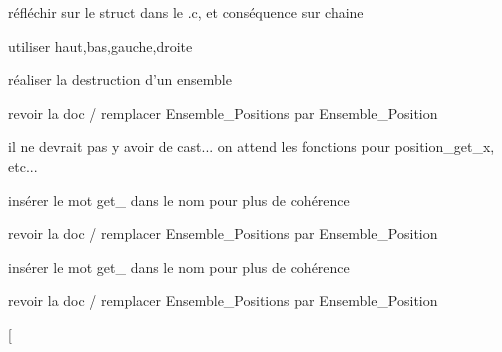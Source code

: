 
\begin{DoxyRefList}
\item[\label{todo__todo000011}%
\hypertarget{todo__todo000011}{}%
\-Membre \hyperlink{libertes_8c_ad3022110d9d089ca0e9672f8aa89bbf1}{determine\-Liberte} (\-Plateau plateau, \-Chaine chaine)]réfléchir sur le struct dans le .c, et conséquence sur chaine 

utiliser haut,bas,gauche,droite  
\item[\label{todo__todo000003}%
\hypertarget{todo__todo000003}{}%
\-Membre \hyperlink{ensemble_8c_a70c89a2b7f9244151c66ffc2b195b8c5}{detruire\-\_\-ensemble} (\hyperlink{structEnsemble}{\-Ensemble} \-E)]réaliser la destruction d'un ensemble  
\item[\label{todo__todo000007}%
\hypertarget{todo__todo000007}{}%
\-Fichier \hyperlink{ensemble__colores_8c}{ensemble\-\_\-colores.c} ]revoir la doc / remplacer \-Ensemble\-\_\-\-Positions par \-Ensemble\-\_\-\-Position  
\item[\label{todo__todo000008}%
\hypertarget{todo__todo000008}{}%
\-Membre \hyperlink{ensemble__colores_8c_a36d527e790ae93f72f0b0c6479f90e41}{ensemble\-\_\-colores\-\_\-appartient} (\hyperlink{structEnsemble__Colores}{\-Ensemble\-\_\-\-Colores} \-E, \hyperlink{structPosition}{\-Position} $\ast$element)]il ne devrait pas y avoir de cast... on attend les fonctions pour position\-\_\-get\-\_\-x, etc...  
\item[\label{todo__todo000005}%
\hypertarget{todo__todo000005}{}%
\-Membre \hyperlink{ensemble_8c_aa9174d08bc657e15cfe1ebf843421731}{ensemble\-\_\-courant} (\hyperlink{structEnsemble}{\-Ensemble} \-E)]insérer le mot get\-\_\- dans le nom pour plus de cohérence  
\item[\label{todo__todo000009}%
\hypertarget{todo__todo000009}{}%
\-Fichier \hyperlink{ensemble__positions_8c}{ensemble\-\_\-positions.c} ]revoir la doc / remplacer \-Ensemble\-\_\-\-Positions par \-Ensemble\-\_\-\-Position  
\item[\label{todo__todo000004}%
\hypertarget{todo__todo000004}{}%
\-Membre \hyperlink{ensemble_8c_a81d2fb89bbbb2b90cacabfa9d6398849}{ensemble\-\_\-tete} (\hyperlink{structEnsemble}{\-Ensemble} \-E)]insérer le mot get\-\_\- dans le nom pour plus de cohérence  
\item[\label{todo__todo000010}%
\hypertarget{todo__todo000010}{}%
\-Fichier \hyperlink{libertes_8c}{libertes.c} ]revoir la doc / remplacer \-Ensemble\-\_\-\-Positions par \-Ensemble\-\_\-\-Position  
\item[\label{todo__todo000001}%
\hypertarget{todo__todo000001}{}%

\end{DoxyRefList}
